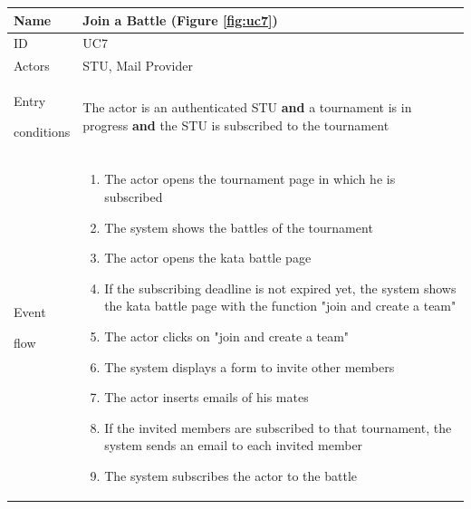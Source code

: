 \begin{center}
    \def\arraystretch{1.5}
    \begin{tabular}{| m{2cm} | m{10cm}|}
        \hline
        Name                  & Join a Battle (Figure \ref{fig:uc7})                                                                                                             \\ \hline
        ID                    & UC7                                                                                                                                              \\ \hline
        Actors                & STU, Mail Provider                                                                                                                               \\ \hline
        Entry \par conditions & The actor is an authenticated STU \textbf{and} a tournament is in progress \textbf{and} the STU is subscribed to the tournament                  \\ \hline
        Event \par flow       & \begin{enumerate}
                                    \item The actor opens the tournament page in which he is subscribed
                                    \item The system shows the battles of the tournament
                                    \item The actor opens the kata battle page
                                    \item If the subscribing deadline is not expired yet, the system shows the kata battle page with the function "join and create a team"
                                    \item The actor clicks on "join and create a team"
                                    \item The system displays a form to invite other members
                                    \item The actor inserts emails of his mates
                                    \item If the invited members are subscribed to that tournament, the system sends an email to each invited member
                                    \item The system subscribes the actor to the battle
                                \end{enumerate}            \\ \hline

\end{tabular}
\end{center}
